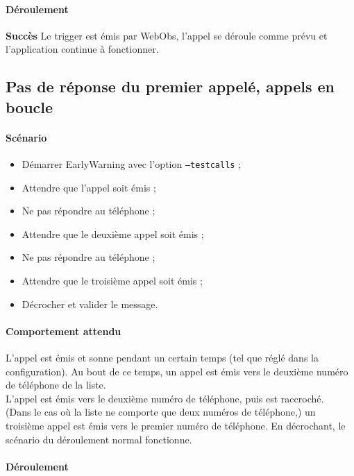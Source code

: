 \documentclass{article}
\begin{document}
\paragraph{Déroulement\\}

\textbf{Succès} Le trigger est émis par WebObs, l'appel se déroule comme prévu et l'application continue à fonctionner.

\subsection{Pas de réponse du premier appelé, appels en boucle}

\paragraph{Scénario}

\begin{itemize}
    \item Démarrer EarlyWarning avec l'option \texttt{--testcalls} ;
    \item Attendre que l'appel soit émis ;
    \item Ne pas répondre au téléphone ;
    \item Attendre que le deuxième appel soit émis ;
    \item Ne pas répondre au téléphone ;
    \item Attendre que le troisième appel soit émis ;
    \item Décrocher et valider le message.
\end{itemize}

\paragraph{Comportement attendu\\}

L'appel est émis et sonne pendant un certain temps (tel que réglé dans la configuration). Au bout de ce temps, un appel est émis vers le deuxième numéro de téléphone de la liste.\\
L'appel est émis vers le deuxième numéro de téléphone, puis est raccroché.\\
(Dans le cas où la liste ne comporte que deux numéros de téléphone,) un troisième appel est émis vers le premier numéro de téléphone. En décrochant, le scénario du déroulement normal fonctionne.

\paragraph{Déroulement\\}
\end{document}
